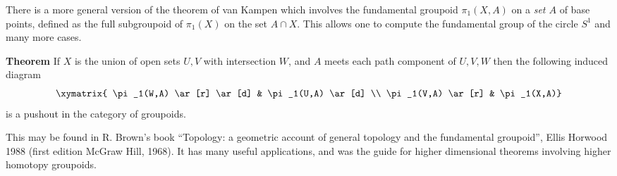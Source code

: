 \documentclass[12pt]{article}
\begin{document}
There is a more general version of the theorem of van Kampen which involves 
the fundamental groupoid $\pi_1(X,A)$ on a {\it set $A$} of base points, 
defined as the full subgroupoid of $\pi_1(X)$ on the set $A \cap X$. This 
allows one to compute the fundamental group of the circle $S^1$ and many more 
cases. 

{\bf Theorem} If $X$ is the union of open sets $U,V$ with intersection $W$,
and $A$ meets each path component of  $U,V,W$ then the following induced diagram 
$$\xymatrix{ \pi_1(W,A) \ar [r] \ar [d] & \pi_1(U,A) \ar [d] \\
\pi_1(V,A)  \ar [r] & \pi_1(X,A)} $$
is a pushout in the category of groupoids. 

This may be found in R. Brown's book ``Topology: a geometric account of general topology
and the fundamental groupoid'', Ellis Horwood 1988 (first edition McGraw Hill, 1968).
It has many useful applications, and was the guide for higher dimensional theorems 
involving higher homotopy groupoids.
\end{document}
